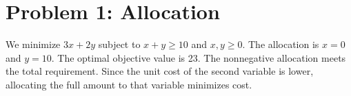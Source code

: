 \section{Problem 1: Allocation}
We minimize $3x+2y$ subject to $x+y\geq 10$ and $x,y\geq 0$.
The allocation is $x=0$ and $y=10$. The optimal objective value is 23.
The nonnegative allocation meets the total requirement. Since the unit cost of the second variable is lower, allocating the full amount to that variable minimizes cost.

